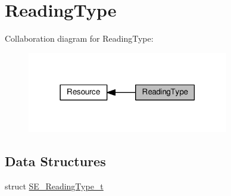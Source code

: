 \hypertarget{group__ReadingType}{}\section{Reading\+Type}
\label{group__ReadingType}
Collaboration diagram for Reading\+Type\+:\nopagebreak
\begin{figure}[H]
\begin{center}
\leavevmode
\includegraphics[width=249pt]{group__ReadingType}
\end{center}
\end{figure}
\subsection*{Data Structures}
\begin{DoxyCompactItemize}
\item 
struct \hyperlink{structSE__ReadingType__t}{S\+E\+\_\+\+Reading\+Type\+\_\+t}
\end{DoxyCompactItemize}
